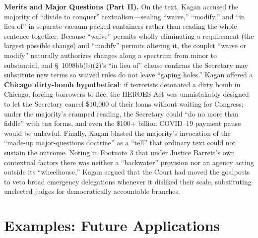 \documentclass[12pt]{article}
\begin{document}
\textbf{Merits and Major Questions (Part II).} On the text, Kagan accused the majority of ``divide to conquer'' textualism---sealing ``waive,'' ``modify,'' and ``in lieu of'' in separate vacuum-packed containers rather than reading the whole sentence together. Because ``waive'' permits wholly eliminating a requirement (the largest possible change) and ``modify'' permits altering it, the couplet ``waive or modify'' naturally authorizes changes along a spectrum from minor to substantial, and \S~1098bb(b)(2)'s ``in lieu of'' clause confirms the Secretary may substitute new terms so waived rules do not leave ``gaping holes.'' Kagan offered a \textbf{Chicago dirty-bomb hypothetical}: if terrorists detonated a dirty bomb in Chicago, forcing borrowers to flee, the HEROES Act was unmistakably designed to let the Secretary cancel \$10,000 of their loans without waiting for Congress; under the majority's cramped reading, the Secretary could ``do no more than fiddle'' with tax forms, and even the \$100+ billion COVID--19 payment pause would be unlawful. Finally, Kagan blasted the majority's invocation of the ``made-up major-questions doctrine'' as a ``tell'' that ordinary text could not sustain the outcome. Noting in Footnote 3 that under Justice Barrett's own contextual factors there was neither a ``backwater'' provision nor an agency acting outside its ``wheelhouse,'' Kagan argued that the Court had moved the goalposts to veto broad emergency delegations whenever it disliked their scale, substituting unelected judges for democratically accountable branches.

\section{Examples: Future Applications}
\end{document}
